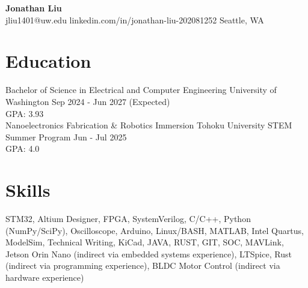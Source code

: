 \documentclass[11pt,letterpaper]{article}
\begin{document}
\begin{center}
{\LARGE \textbf{Jonathan Liu}}\\[2pt]
\small jliu1401@uw.edu \textbullet{} linkedin.com/in/jonathan-liu-202081252 \textbullet{} Seattle, WA
\end{center}
\section*{Education}
\noindent Bachelor of Science in Electrical and Computer Engineering \textbar{} University of Washington \textbar{} Sep 2024 - Jun 2027 (Expected)\\
GPA: 3.93\\
\noindent Nanoelectronics Fabrication \& Robotics Immersion \textbar{} Tohoku University STEM Summer Program \textbar{} Jun - Jul 2025\\
GPA: 4.0\\
\section*{Skills}
STM32, Altium Designer, FPGA, SystemVerilog, C/C++, Python (NumPy/SciPy), Oscilloscope, Arduino, Linux/BASH, MATLAB, Intel Quartus, ModelSim, Technical Writing, KiCad, JAVA, RUST, GIT, SOC, MAVLink, Jetson Orin Nano (indirect via embedded systems experience), LTSpice, Rust (indirect via programming experience), BLDC Motor Control (indirect via hardware experience)
\end{document}
